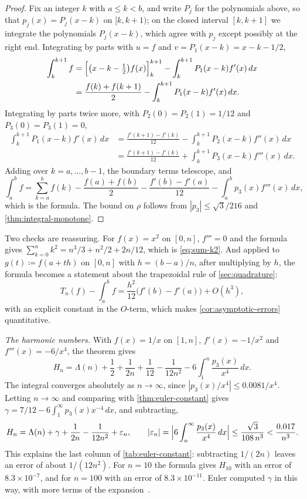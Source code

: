 \begin{proof}
Fix an integer $k$ with $a\le k<b$, and write $P_j$ for the polynomials above, so that $p_j(x)=P_j(x-k)$ on $[k,k+1)$; on the closed interval $[k,k+1]$ we integrate the polynomials $P_j(x-k)$, which agree with $p_j$ except possibly at the right end. Integrating by parts with $u=f$ and $v=P_1(x-k)=x-k-1/2$,
\begin{align*}
\int_k^{k+1}f&=\Bigl[\bigl(x-k-\tfrac12\bigr)f(x)\Bigr]_k^{k+1}-\int_k^{k+1}P_1(x-k)f'(x)\,dx\\
&=\frac{f(k)+f(k+1)}2-\int_k^{k+1}P_1(x-k)f'(x)\,dx .
\end{align*}
Integrating by parts twice more, with $P_2(0)=P_2(1)=1/12$ and $P_3(0)=P_3(1)=0$,
\begin{align*}
\int_k^{k+1}P_1(x-k)f'(x)\,dx&=\frac{f'(k+1)-f'(k)}{12}-\int_k^{k+1}P_2(x-k)f''(x)\,dx\\
&=\frac{f'(k+1)-f'(k)}{12}+\int_k^{k+1}P_3(x-k)f'''(x)\,dx .
\end{align*}
Adding over $k=a,\ldots,b-1$, the boundary terms telescope, and
\[
\int_a^bf=\sum_{k=a}^bf(k)-\frac{f(a)+f(b)}2-\frac{f'(b)-f'(a)}{12}-\int_a^bp_3(x)f'''(x)\,dx ,
\]
which is the formula. The bound on $\rho$ follows from $|p_3|\le\sqrt3/216$ and \cref{thm:integral-monotone}.
\end{proof}

Two checks are reassuring. For $f(x)=x^2$ on $[0,n]$, $f'''=0$ and the formula gives $\sum_{k=0}^nk^2=n^3/3+n^2/2+2n/12$, which is \eqref{eq:sum-k2}. And applied to $g(t)\coloneqq f(a+th)$ on $[0,n]$ with $h=(b-a)/n$, after multiplying by $h$, the formula becomes a statement about the trapezoidal rule of \cref{sec:quadrature}:
\[
T_n(f)-\int_a^bf=\frac{h^2}{12}\bigl(f'(b)-f'(a)\bigr)+O(h^3),
\]
with an explicit constant in the $O$-term, which makes \cref{cor:asymptotic-errors} quantitative.

\emph{The harmonic numbers.} With $f(x)=1/x$ on $[1,n]$, $f'(x)=-1/x^2$ and $f'''(x)=-6/x^4$, the theorem gives
\[
H_n=\Lambda(n)+\frac12+\frac1{2n}+\frac1{12}-\frac1{12n^2}-6\int_1^n\frac{p_3(x)}{x^4}\,dx .
\]
The integral converges absolutely as $n\to\infty$, since $|p_3(x)/x^4|\le0.0081/x^4$. Letting $n\to\infty$ and comparing with \cref{thm:euler-constant} gives $\gamma=7/12-6\int_1^\infty p_3(x)x^{-4}\,dx$, and subtracting,
\begin{equation}
H_n=\Lambda(n)+\gamma+\frac1{2n}-\frac1{12n^2}+\varepsilon_n,\qquad|\varepsilon_n|=\Bigl|6\int_n^\infty\frac{p_3(x)}{x^4}\,dx\Bigr|\le\frac{\sqrt3}{108\,n^3}<\frac{0.017}{n^3}.
\label{eq:harmonic-expansion}
\end{equation}
This explains the last column of \cref{tab:euler-constant}: subtracting $1/(2n)$ leaves an error of about $1/(12n^2)$. For $n=10$ the formula gives $H_{10}$ with an error of $8.3\times10^{-7}$, and for $n=100$ with an error of $8.3\times10^{-11}$. Euler computed $\gamma$ in this way, with more terms of the expansion~\cite{lagarias2013gamma}.

